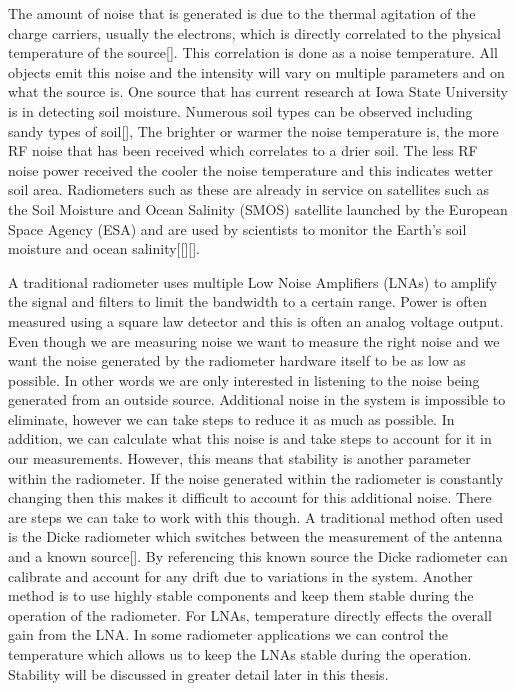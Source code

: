 The amount of noise that is generated is due to the thermal agitation of the charge carriers, usually the electrons, which is directly correlated to the physical temperature of the source[\cite{Nyquist1928thermal}].  This correlation is done as a noise temperature.  All objects emit this noise and the intensity will vary on multiple parameters and on what the source is.  One source that has current research at Iowa State University is in detecting soil moisture.  Numerous soil types can be observed including sandy types of soil[\cite{Liu}], The brighter or warmer the noise temperature is, the more RF noise that has been received which correlates to a drier soil.  The less RF noise power received the cooler the noise temperature and this indicates wetter soil area. Radiometers such as these are already in service on satellites such as the Soil Moisture and Ocean Salinity (SMOS) satellite launched by the European Space Agency (ESA) and are used by scientists to monitor the Earth's soil moisture and ocean salinity[[\cite{McMullan}][\cite{Hardy}].  

A traditional radiometer uses multiple Low Noise Amplifiers (LNAs) to amplify the signal and filters to limit the bandwidth to a certain range.  Power is often measured using a square law detector and this is often an analog voltage output.  Even though we are measuring noise we want to measure the right noise and we want the noise generated by the radiometer hardware itself to be as low as possible.  In other words we are only interested in listening to the noise being generated from an outside source.  Additional noise in the system is impossible to eliminate, however we can take steps to reduce it as much as possible.  In addition, we can calculate what this noise is and take steps to account for it in our measurements.  However, this means that stability is another parameter within the radiometer.  If the noise generated within the radiometer is constantly changing then this makes it difficult to account for this additional noise.  There are steps we can take to work with this though.  A traditional method often used is the Dicke radiometer which switches between the measurement of the antenna and a known source[\cite{Dicke}].  By referencing this known source the Dicke radiometer can calibrate and account for any drift due to variations in the system.  Another method is to use highly stable components and keep them stable during the operation of the radiometer.  For LNAs, temperature directly effects the overall gain from the LNA.  In some radiometer applications we can control the temperature which allows us to keep the LNAs stable during the operation.  Stability will be discussed in greater detail later in this thesis.


